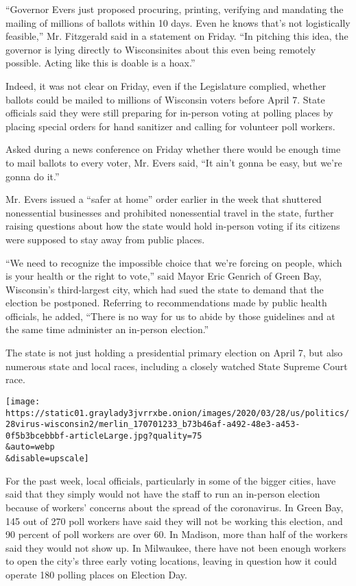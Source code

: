 ``Governor Evers just proposed procuring, printing, verifying and
mandating the mailing of millions of ballots within 10 days. Even he
knows that's not logistically feasible,'' Mr. Fitzgerald said in a
statement on Friday. ``In pitching this idea, the governor is lying
directly to Wisconsinites about this even being remotely possible.
Acting like this is doable is a hoax.''

Indeed, it was not clear on Friday, even if the Legislature complied,
whether ballots could be mailed to millions of Wisconsin voters before
April 7. State officials said they were still preparing for in-person
voting at polling places by placing special orders for hand sanitizer
and calling for volunteer poll workers.

Asked during a news conference on Friday whether there would be enough
time to mail ballots to every voter, Mr. Evers said, ``It ain't gonna be
easy, but we're gonna do it.''

Mr. Evers issued a ``safer at home'' order earlier in the week that
shuttered nonessential businesses and prohibited nonessential travel in
the state, further raising questions about how the state would hold
in-person voting if its citizens were supposed to stay away from public
places.

``We need to recognize the impossible choice that we're forcing on
people, which is your health or the right to vote,'' said Mayor Eric
Genrich of Green Bay, Wisconsin's third-largest city, which had sued the
state to demand that the election be postponed. Referring to
recommendations made by public health officials, he added, ``There is no
way for us to abide by those guidelines and at the same time administer
an in-person election.''

The state is not just holding a presidential primary election on April
7, but also numerous state and local races, including a closely watched
State Supreme Court race.

\texttt{[image: https://static01.graylady3jvrrxbe.onion/images/2020/03/28/us/politics/28virus-wisconsin2/merlin\_170701233\_b73b46af-a492-48e3-a453-0f5b3bcebbbf-articleLarge.jpg?quality=75\\\&auto=webp\\\&disable=upscale]}

For the past week, local officials, particularly in some of the bigger
cities, have said that they simply would not have the staff to run an
in-person election because of workers' concerns about the spread of the
coronavirus. In Green Bay, 145 out of 270 poll workers have said they
will not be working this election, and 90 percent of poll workers are
over 60. In Madison, more than half of the workers said they would not
show up. In Milwaukee, there have not been enough workers to open the
city's three early voting locations, leaving in question how it could
operate 180 polling places on Election Day.

